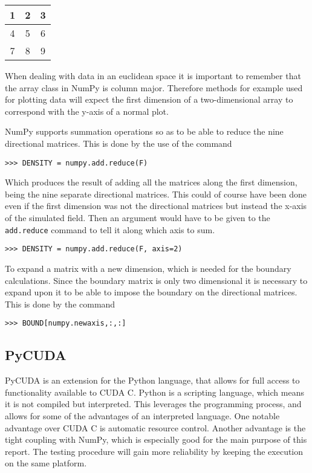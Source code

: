 \begin{tabular}{|c|c|c|}
\hline
1 & 2 & 3 \\
\hline
4 & 5 & 6 \\
\hline
7 & 8 & 9 \\
\hline
\end{tabular}

When dealing with data in an euclidean space it is important to remember that the array class in NumPy is column major. Therefore methods for example used for plotting data will expect the first dimension of a two-dimensional array to correspond with the y-axis of a normal plot. 

NumPy supports summation operations so as to be able to reduce the nine directional matrices. This is done by the use of the command

\begin{verbatim}
>>> DENSITY = numpy.add.reduce(F)
\end{verbatim}

Which produces the result of adding all the matrices along the first dimension, being the nine separate directional matrices. This could of course have been done even if the first dimension was not the directional matrices but instead the x-axis of the simulated field. Then an argument would have to be given to the \texttt{add.reduce} command to tell it along which axis to sum.

\begin{verbatim}
>>> DENSITY = numpy.add.reduce(F, axis=2)
\end{verbatim}

To expand a matrix with a new dimension, which is needed for the boundary calculations. Since the boundary matrix is only two dimensional it is necessary to expand upon it to be able to impose the boundary on the directional matrices. This is done by the command

\begin{verbatim}
>>> BOUND[numpy.newaxis,:,:]
\end{verbatim}



\subsection{PyCUDA}
PyCUDA is an extension for the Python language, that allows for full access to functionality available to CUDA C. Python is a scripting language, which means it is not compiled but interpreted. This leverages the programming process, and allows for some of the advantages of an interpreted language. One notable advantage over CUDA C is automatic resource control. Another advantage is the tight coupling with NumPy, which is especially good for the main purpose of this report. The testing procedure will gain more reliability by keeping the execution on the same platform.

